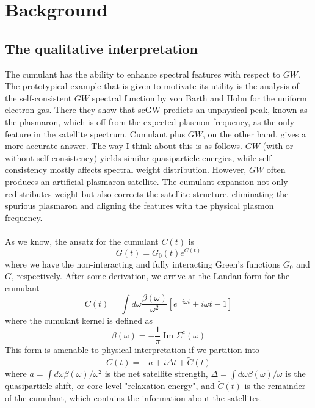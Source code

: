 \section{Background}
\subsection{The qualitative interpretation}
The cumulant has the ability to enhance spectral features with respect to $GW$. The prototypical example that is given to motivate its utility is the analysis of the self-consistent $GW$ spectral function by von Barth and Holm for the uniform electron gas. There they show that scGW predicts an unphysical peak, known as the plasmaron, which is off from the expected plasmon frequency, as the only feature in the satellite spectrum. Cumulant plus $GW$, on the other hand, gives a more accurate answer. 
The way I think about this is as follows. $GW$ (with or without self-consistency) yields similar quasiparticle energies, while self-consistency mostly affects spectral weight distribution. However, $GW$ often produces an artificial plasmaron satellite. The cumulant expansion not only redistributes weight but also corrects the satellite structure, eliminating the spurious plasmaron and aligning the features with the physical plasmon frequency.\\\\
As we know, the ansatz for the cumulant $C(t)$ is
\begin{equation}
    G(t) = G_0(t) e^{C(t)}
\end{equation}
where we have the non-interacting and fully interacting Green's functions $G_0$ and $G$, respectively. After some derivation, we arrive at the Landau form for the cumulant
\begin{equation}
    C(t)=\int d \omega \frac{\beta(\omega)}{\omega^2}\left[e^{-i \omega t}+i \omega t-1\right]
\end{equation}
where the cumulant kernel is defined as
\begin{equation}
    \beta(\omega)=-\frac{1}{\pi} \operatorname{Im} \Sigma^{\mathrm{c}}(\omega)
\end{equation}
This form is amenable to physical interpretation if we partition into
\begin{equation}
    C(t)=-a+i \Delta t+\tilde{C}(t)
\end{equation}
where $a=\int d \omega \beta(\omega) / \omega^2$ is the net satellite strength, $\Delta=\int d \omega \beta(\omega) / \omega$ is the quasiparticle shift, or core-level "relaxation energy", and $\tilde{C}(t)$ is the remainder of the cumulant, which contains the information about the satellites.

